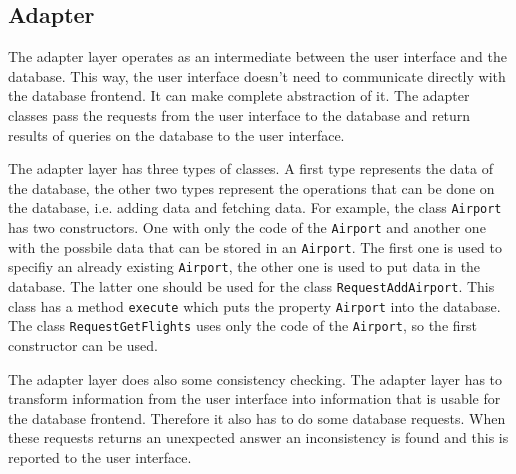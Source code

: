 
\subsection{Adapter}
The adapter layer operates as an intermediate between the user interface and the database. This way, the user interface doesn't need to communicate directly with the database frontend. It can make complete abstraction of it. The adapter classes pass the requests from the user interface to the database and return results of queries on the database to the user interface.

The adapter layer has three types of classes. A first type represents the data of the database, the other two types represent the operations that can be done on the database, i.e. adding data and fetching data. For example, the class \texttt{Airport} has two constructors. One with only the code of the \texttt{Airport} and another one with the possbile data that can be stored in an \texttt{Airport}. The first one is used to specifiy an already existing \texttt{Airport}, the other one is used to put data in the database. The latter one should be used for the class \texttt{RequestAddAirport}. This class has a method \texttt{execute} which puts the property \texttt{Airport} into the database. The class \texttt{RequestGetFlights} uses only the code of the \texttt{Airport}, so the first constructor can be used.

The adapter layer does also some consistency checking. The adapter layer has to transform information from the user interface into information that is usable for the database frontend. Therefore it also has to do some database requests. When these requests returns an unexpected answer an inconsistency is found and this is reported to the user interface.